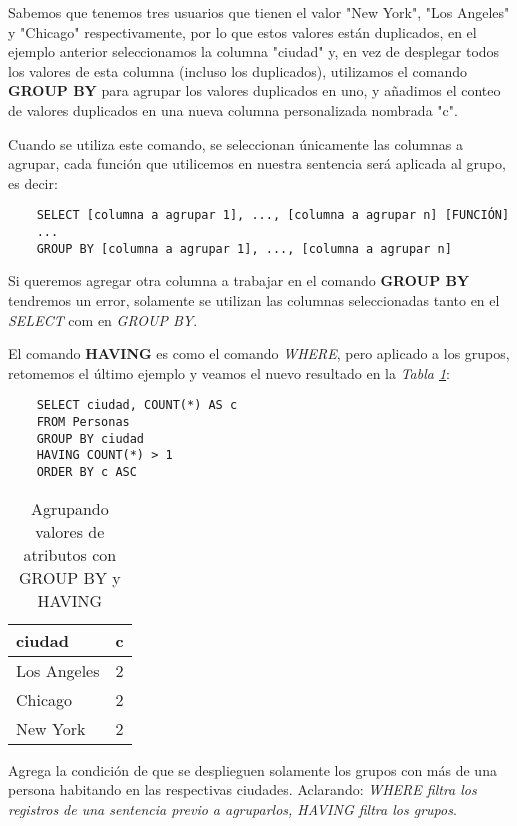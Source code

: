 Sabemos que tenemos tres usuarios que tienen el valor "New York", "Los Angeles" y "Chicago" respectivamente, por lo que estos valores están duplicados, en el ejemplo anterior seleccionamos la columna "ciudad" y, en vez de desplegar todos los valores de esta columna (incluso los duplicados), utilizamos el comando \textbf{GROUP BY} para agrupar los valores duplicados en uno, y añadimos el conteo de valores duplicados en una nueva columna personalizada nombrada "c".

Cuando se utiliza este comando, se seleccionan únicamente las columnas a agrupar, cada función que utilicemos en nuestra sentencia será aplicada al grupo, es decir:
\begin{lstlisting}
    SELECT [columna a agrupar 1], ..., [columna a agrupar n] [FUNCIÓN]
    ...
    GROUP BY [columna a agrupar 1], ..., [columna a agrupar n]
\end{lstlisting}

Si queremos agregar otra columna a trabajar en el comando \textbf{GROUP BY} tendremos un error, solamente se utilizan las columnas seleccionadas tanto en el \textit{SELECT} com en \textit{GROUP BY}.

El comando \textbf{HAVING} es como el comando \textit{WHERE}, pero aplicado a los grupos, retomemos el último ejemplo y veamos el nuevo resultado en la \textit{Tabla \ref{tab: 19}}:
\begin{lstlisting}
    SELECT ciudad, COUNT(*) AS c
    FROM Personas
    GROUP BY ciudad
    HAVING COUNT(*) > 1
    ORDER BY c ASC
\end{lstlisting}
\begin{table}[H]
    \centering
    \caption{Agrupando valores de atributos con GROUP BY y HAVING}
    \label{tab: 19}
    \begin{tabular}{|l|l|}
        \hline
        \textbf{ciudad} & \textbf{c} \\
        \hline
        Los Angeles     & 2 \\
        \hline
        Chicago         & 2 \\
        \hline
        New York        & 2 \\
        \hline
    \end{tabular}
\end{table}

Agrega la condición de que se desplieguen solamente los grupos con más de una persona habitando en las respectivas ciudades. Aclarando: \textit{WHERE filtra los registros de una sentencia previo a agruparlos, HAVING filtra los grupos}.

